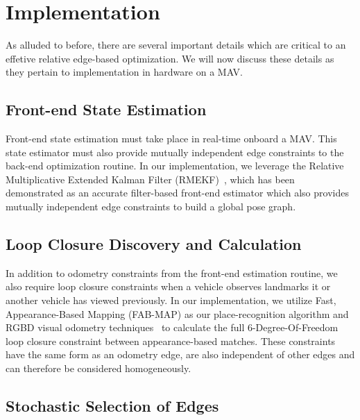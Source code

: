 
\section{Implementation}
As alluded to before, there are several important details which are critical to an effetive relative edge-based optimization.  We will now discuss these details as they pertain to implementation in hardware on a MAV.

\subsection{Front-end State Estimation}
Front-end state estimation must take place in real-time onboard a MAV. This state estimator must also provide mutually independent edge constraints to the back-end optimization routine.  In our implementation, we leverage the Relative Multiplicative Extended Kalman Filter (RMEKF)~\cite{Koch2017}, which has been demonstrated as an accurate filter-based front-end estimator which also provides mutually independent edge constraints to build a global pose graph.

\subsection{Loop Closure Discovery and Calculation}
In addition to odometry constraints from the front-end estimation routine, we also require loop closure constraints when a vehicle observes landmarks it or another vehicle has viewed previously.  In our implementation, we utilize Fast, Appearance-Based Mapping (FAB-MAP) as our place-recognition algorithm and RGBD visual odometry techniques~\cite{Leishman2013} to calculate the full 6-Degree-Of-Freedom loop closure constraint between appearance-based matches.  These constraints have the same form as an odometry edge, are also independent of other edges and can therefore be considered homogeneously.

\subsection{Stochastic Selection of Edges}


